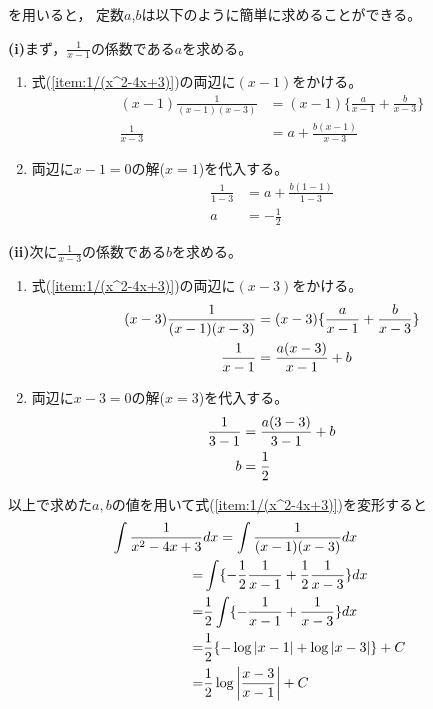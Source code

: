 \documentclass[twocolumn,11pt]{jarticle}
\begin{document}
を用いると，
定数$a$,$b$は以下のように簡単に求めることができる。

\noindent
\textbf{(i)}まず，$\frac{1}{x-1}$の係数である$a$を求める。
\begin{enumerate}
\item 式(\ref{item:1/(x^2-4x+3)})の両辺に$(x-1)$をかける。
\begin{align*}
  (x-1)\frac{1}{(x-1)(x-3)}&=(x-1)\{\frac{a}{x-1}+\frac{b}{x-3}\}\\
  \frac{1}{x-3}&=a+\frac{b(x-1)}{x-3}
\end{align*}
\item 両辺に$x-1=0$の解($x=1$)を代入する。
\begin{align*}
  \frac{1}{1-3}&=a+\frac{b(1-1)}{1-3}\\
  a&=-\frac{1}{2}
\end{align*}
\end{enumerate}

\noindent
\textbf{(ii)}次に$\frac{1}{x-3}$の係数である$b$を求める。
\begin{enumerate}
\item 式(\ref{item:1/(x^2-4x+3)})の両辺に$(x-3)$をかける。
\begin{align}
  (x-3)\frac{1}{(x-1)(x-3)}&=(x-3)\{\frac{a}{x-1}+\frac{b}{x-3}\}\notag\\
  \frac{1}{x-1}&=\frac{a(x-3)}{x-1}+b\notag
\end{align}
\item 両辺に$x-3=0$の解($x=3$)を代入する。
\begin{align}
  \frac{1}{3-1}&=\frac{a(3-3)}{3-1}+b\notag\\
  b&=\frac{1}{2}\notag
\end{align}
\end{enumerate}
以上で求めた$a,b$の値を用いて式(\ref{item:1/(x^2-4x+3)})を変形すると
\begin{align}
  \int \frac{1}{x^2-4x+3}&dx=\int \frac{1}{(x-1)(x-3)}dx\notag\\
  =&\int\{-\frac{1}{2}\frac{1}{x-1}+\frac{1}{2}\frac{1}{x-3}\}dx\notag\\
  =&\frac{1}{2}\int\{-\frac{1}{x-1}+\frac{1}{x-3}\}dx\notag\\
  =&\frac{1}{2}\{-\log|x-1|+\log|x-3|\}+C\notag\\
  =&\frac{1}{2}\log\left|\frac{x-3}{x-1}\right|+C\notag
\end{align}
\end{document}
